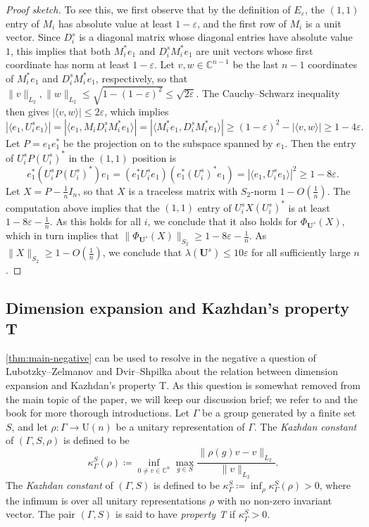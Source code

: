 \documentclass[11pt]{article}
\newcommand{\C}{{\mathbb C}}
\theoremstyle{plain}
\numberwithin{equation}{section}
\theoremstyle{definition}
\newcommand{\bC}{\mathbb{C}}
\newcommand{\norm}[1]{\lVert#1\rVert}
\newcommand{\ab}[1]{\left\lvert#1\right\rvert}
\newcommand{\U}{\mathrm{U}}
\newcommand{\tuple}[1]{\mathbf{#1}}
\newcommand{\vU}{\tuple{U}}
\begin{document}
\begin{proof}[Proof sketch]
To see this, we first observe that by the definition of $E_\varepsilon$, the $(1,1)$ entry of $M_i$ has absolute value at least $1- \varepsilon$, and the first row of $M_i$ is a unit vector. Since $D_i^s$ is a diagonal matrix whose diagonal entries have absolute value $1$, this implies that both $M_i^* e_1$ and $D_i^s M_i^* e_1$ are unit vectors whose first coordinate has norm at least $1- \varepsilon$. Let $v,w \in \bC^{n-1}$ be the last $n-1$ coordinates of $M_i^* e_1$ and $D_i^s M_i^* e_1$, respectively, so that $\norm v_{L_2},\norm w_{L_2} \leq \sqrt{1-(1- \varepsilon)^2} \leq \sqrt{2 \varepsilon}$.
The Cauchy--Schwarz inequality then gives $\ab{\langle v,w\rangle} \leq 2 \varepsilon$, which implies 
\[
    \ab{\langle e_1,U_i^s e_1\rangle} = \ab{\langle e_1, M_i D_i^s M_i^* e_1\rangle} = \ab{\langle M_i^* e_1, D_i^s M_i^* e_1\rangle} \geq (1- \varepsilon)^2 - \ab{\langle v,w\rangle}  \geq 1- 4 \varepsilon.
\]
Let $P = e_1e_1^*$ be the projection on to the subspace spanned by $e_1$. Then the entry of $U_i^s P (U_i^s)^*$ in the $(1,1)$ position is
\[
    e_1^* \left(U_i^s P (U_i^s)^*\right) e_1 = (e_1^* U_i^s e_1) (e_1^* (U_i^s)^* e_1) = \ab{\langle e_1,U_i^s e_1\rangle}^2 \geq 1- 8 \varepsilon.
\]
Let $X = P - \frac1 n I_n$, so that $X$ is a traceless matrix with $S_2$-norm $1-O(\frac 1n)$. The computation above implies that the $(1,1)$ entry of $U_i^s X (U_i^s)^*$ is at least $1-8 \varepsilon- \frac 1n$. As this holds for all $i$, we conclude that it also holds for $\Phi_{\vU^s}(X)$, which in turn implies that $\norm{\Phi_{\vU^s}(X)}_{S_2} \geq 1- 8 \varepsilon - \frac 1n$. As $\norm X_{S_2} \geq 1- O(\frac 1n)$, we conclude that $\lambda(\vU^s) \leq 10 \varepsilon$ for all sufficiently large $n$.
\end{proof}

\subsection{Dimension expansion and Kazhdan's property T}\label{sec:kazhdan}
\cref{thm:main-negative} can be used to resolve in the negative a question of Lubotzky--Zelmanov \cite{LUBOTZKY2008730} and Dvir--Shpilka \cite{DS09} about the relation between dimension expansion and Kazhdan's property T. As this question is somewhat removed from the main topic of the paper, we will keep our discussion brief; we refer to \cite{LUBOTZKY2008730,DS09} and the book \cite{Lubotzky_book} for more thorough introductions. Let $\Gamma$ be a group generated by a finite set $S$, and let $\rho:\Gamma \to \U(n)$ be a unitary representation of $\Gamma$. The \emph{Kazhdan constant} of $(\Gamma,S,\rho)$ is defined to be
\[
    \kappa_\Gamma^S(\rho) \coloneqq \inf_{0 \neq v \in \C^n} \max_{g \in S} \frac{\norm{\rho(g)v-v}_{L_2}}{\norm v_{L_2}}.
\]
The \emph{Kazhdan constant} of $(\Gamma,S)$ is defined to be $\kappa_\Gamma^S \coloneqq \inf_\rho \kappa_\Gamma^S(\rho)>0$, where the infimum is over all unitary representations $\rho$ with no non-zero invariant vector. The pair $(\Gamma,S)$ is said to have \emph{property T} if $\kappa_\Gamma^S>0$.
\end{document}
